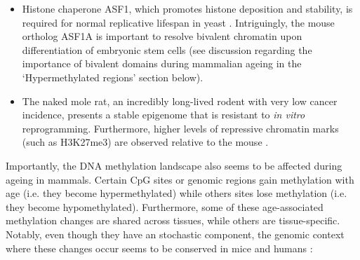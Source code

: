 \begin{itemize}
	\item Histone chaperone ASF1, which promotes histone deposition and stability, is required for normal replicative lifespan in yeast \cite{Feser2010}. Intriguingly, the mouse ortholog ASF1A is important to resolve bivalent chromatin upon differentiation of embryonic stem cells \cite{Gao2018} (see discussion regarding the importance of bivalent domains during mammalian ageing in the `Hypermethylated regions' section below).
	
	\item The naked mole rat, an incredibly long-lived rodent with very low cancer incidence, presents a stable epigenome that is resistant to \textit{in vitro} reprogramming. Furthermore, higher levels of repressive chromatin marks (such as H3K27me3) are observed relative to the mouse \cite{Tan2017}. 
	
\end{itemize}

Importantly, the DNA methylation landscape also seems to be affected during ageing in mammals. Certain CpG sites or genomic regions gain methylation with age (i.e. they become hypermethylated) while others sites lose methylation (i.e. they become hypomethylated). Furthermore, some of these age-associated methylation changes are shared across tissues, while others are tissue-specific. Notably, even though they have an stochastic component, the genomic context where these changes occur seems to be conserved in mice \cite{Maegawa2010,Avrahami2015,Wang2017,Cole2017,Sziraki2018} and humans \cite{Rakyan2010,Teschendorff2010,Horvath2012,Heyn2012,Day2013,Raddatz2013,Weidner2014,Fernandez2015,Dozmorov2015,Yuan2015,Slieker2016,Slieker2018,Zhu2018}:


